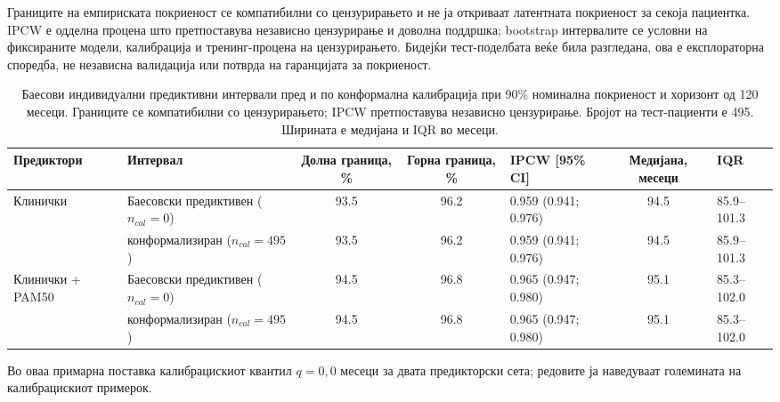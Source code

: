 \documentclass[12pt]{article}
\begin{document}
Границите на емпириската покриеност се компатибилни со цензурирањето и не ја
откриваат латентната покриеност за секоја пациентка. IPCW е одделна процена што
претпоставува независно цензурирање и доволна поддршка; bootstrap интервалите
се условни на фиксираните модели, калибрација и тренинг-процена на
цензурирањето. Бидејќи тест-поделбата веќе била разгледана, ова е експлораторна
споредба, не независна валидација или потврда на гаранцијата за покриеност.

\begin{table}[htbp]
\centering
\small
\setlength{\tabcolsep}{4pt}
\caption{Баесови индивидуални предиктивни интервали пред и по конформална калибрација при 90\% номинална покриеност и хоризонт од 120 месеци. Границите се компатибилни со цензурирањето; IPCW претпоставува независно цензурирање. Бројот на тест-пациенти е 495. Ширината е медијана и IQR во месеци.}
\label{tab:bayesian-conformal-primary-metrics}
\begin{tabular}{@{}ll S[table-format=2.1] S[table-format=2.1] l S[table-format=3.1] l@{}}
\toprule
Предиктори & Интервал & {Долна граница, \%} & {Горна граница, \%} & IPCW [95\% CI] & {Медијана, месеци} & IQR \\
\midrule
Клинички & Баесовски предиктивен ($n_{cal}=0$) & 93.5 & 96.2 & 0.959 (0.941; 0.976) & 94.5 & 85.9--101.3 \\
 & конформализиран ($n_{cal}=495$) & 93.5 & 96.2 & 0.959 (0.941; 0.976) & 94.5 & 85.9--101.3 \\
Клинички + PAM50 & Баесовски предиктивен ($n_{cal}=0$) & 94.5 & 96.8 & 0.965 (0.947; 0.980) & 95.1 & 85.3--102.0 \\
 & конформализиран ($n_{cal}=495$) & 94.5 & 96.8 & 0.965 (0.947; 0.980) & 95.1 & 85.3--102.0 \\
\bottomrule
\end{tabular}
\begin{minipage}{0.98\linewidth}\footnotesize
Во оваа примарна поставка калибрацискиот квантил $q=0,0$ месеци за двата
предикторски сета; редовите ја наведуваат големината на калибрацискиот примерок.
\end{minipage}
\end{table}
\end{document}
